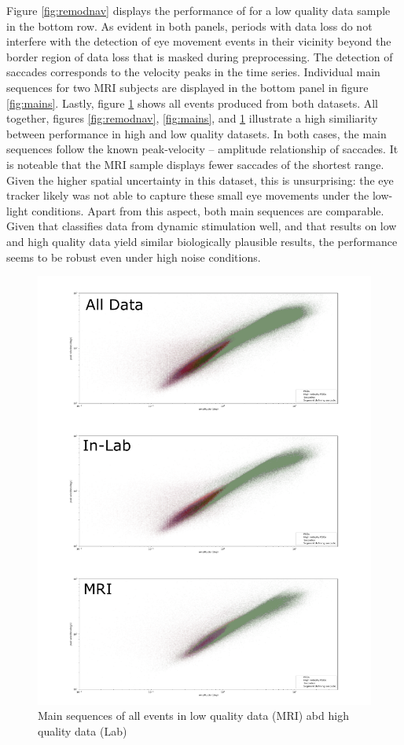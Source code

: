 Figure \ref{fig:remodnav} displays the performance of \remodnav for a low quality data sample in the bottom row.
As evident in both panels, periods with data loss do not interfere with the detection of eye movement events in
their vicinity beyond the border region of data loss that is masked during preprocessing. The detection of
saccades corresponds to the velocity peaks in the time series. Individual main sequences for two MRI subjects are
displayed in the bottom panel in figure \ref{fig:mains}. Lastly, figure \ref{fig:overallComp} shows all events
produced from both datasets. All together, figures \ref{fig:remodnav}, \ref{fig:mains}, and \ref{fig:overallComp}
illustrate a high similiarity between performance in high and low quality datasets. In both cases, the main
sequences follow the known peak-velocity -- amplitude relationship of saccades. It is noteable that the MRI
sample displays fewer saccades of the shortest range. Given the higher spatial uncertainty in this dataset, this
is unsurprising: the eye tracker likely was not able to capture these small eye movements under the low-light
conditions. Apart from this aspect, both main sequences are comparable. Given that \remodnav classifies data from
dynamic stimulation well, and that results on low and high quality data yield similar biologically plausible
results, the performance seems to be robust even under high noise conditions.

\begin{figure}[h!]
    \includegraphics[width=1\textwidth]{img/overallCompar.pdf}
    \caption{Main sequences of all events in low quality data (MRI) abd high quality data (Lab)}
    \label{fig:overallComp}
\end{figure}


